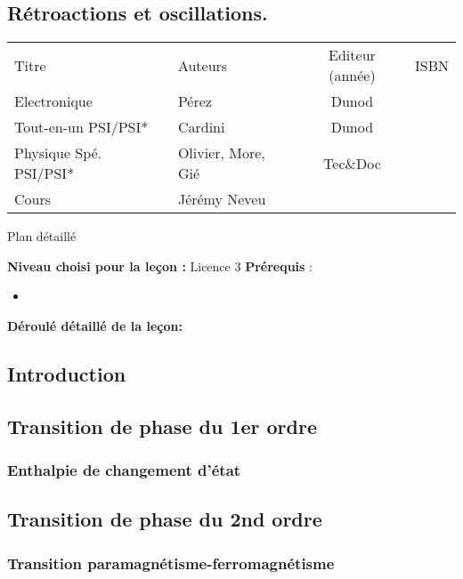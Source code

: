 \begin{headerBlock}
  \chapter{Rétroactions et oscillations.}
  \label{LP_RetroactionOscillation} 
\end{headerBlock}




\begin{center}
\begin{tabularx}{\textwidth}{| X | X | c | c |}
  \hline
  \rowcolor{gray!20}\multicolumn{4}{c}{Bibliographie de la leçon : } \\
  \hline 
  Titre & Auteurs & Editeur (année) & ISBN \\
  \hline
  Electronique & Pérez & Dunod & \\
  \hline 
  Tout-en-un PSI/PSI* & Cardini & Dunod &    \\
  \hline 
  Physique Spé. PSI/PSI* & Olivier, More, Gié & Tec\&Doc & \\
  \hline 
  Cours & Jérémy Neveu & & \\
  \hline
\end{tabularx}
\end{center}


\begin{reportBlock}{Plan détaillé}

  \textbf{Niveau choisi pour la leçon :} Licence 3
  \newline
  \textbf{Prérequis} : \begin{itemize}
      \item 
  \end{itemize}

  \textbf{Déroulé détaillé de la leçon: }  
  
  \section*{Introduction}

  \section{Transition de phase du 1er ordre}
  \subsection{Enthalpie de changement d'état} 


  \section{Transition de phase du 2nd ordre}
\subsection{Transition paramagnétisme-ferromagnétisme}


\end{reportBlock}